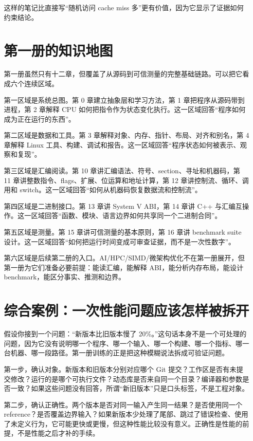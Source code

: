 这样的笔记比直接写“随机访问 cache miss 多”更有价值，因为它显示了证据如何约束结论。

\section{第一册的知识地图}

第一册虽然只有十二章，但覆盖了从源码到可信测量的完整基础链路。可以把它看成六个连续区域。

第一区域是系统总图。第 0 章建立抽象层和学习方法，第 1 章把程序从源码带到进程，第 2 章解释 CPU 如何把指令作为状态变化执行。这一区域回答“程序如何成为正在运行的东西”。

第二区域是数据和工具。第 3 章解释对象、内存、指针、布局、对齐和别名，第 4 章解释 Linux 工具、构建、调试和报告。这一区域回答“程序状态如何被表示、观察和复现”。

第三区域是汇编阅读。第 10 章讲汇编语法、符号、section、寻址和机器码，第 11 章讲整数指令、flags、扩展、位运算和地址计算，第 12 章讲控制流、循环、调用和 switch。这一区域回答“如何从机器码恢复数据流和控制流”。

第四区域是二进制接口。第 13 章讲 System V ABI，第 14 章讲 C++ 与汇编互操作。这一区域回答“函数、模块、语言边界如何共享同一个二进制合同”。

第五区域是测量。第 15 章讲可信测量的基本原则，第 16 章讲 benchmark suite 设计。这一区域回答“如何把运行时间变成可审查证据，而不是一次性数字”。

第六区域是后续第二册的入口。AI/HPC/SIMD/微架构优化不在第一册展开，但第一册为它们准备必要前提：能读汇编，能解释 ABI，能分析内存布局，能设计 benchmark，能区分事实、推测和边界。

\section{综合案例：一次性能问题应该怎样被拆开}

假设你接到一个问题：“新版本比旧版本慢了 20\%。”这句话本身不是一个可处理的问题，因为它没有说明哪一个程序、哪一个输入、哪一个构建、哪一个指标、哪一台机器、哪一段路径。第一册训练的正是把这种模糊说法拆成可验证问题。

第一步，确认对象。新版本和旧版本分别对应哪个 Git 提交？工作区是否有未提交修改？运行的是哪个可执行文件？动态库是否来自同一个目录？编译器和参数是否一致？如果这些问题没有回答，所谓“新旧版本”只是口头标签，不是工程对象。

第二步，确认正确性。两个版本是否对同一输入产生同一结果？是否使用同一个 reference？是否覆盖边界输入？如果新版本少处理了尾部、跳过了错误检查、使用了未定义行为，它可能更快或更慢，但这种性能比较没有意义。正确性是性能的前提，不是性能之后才补的手续。

